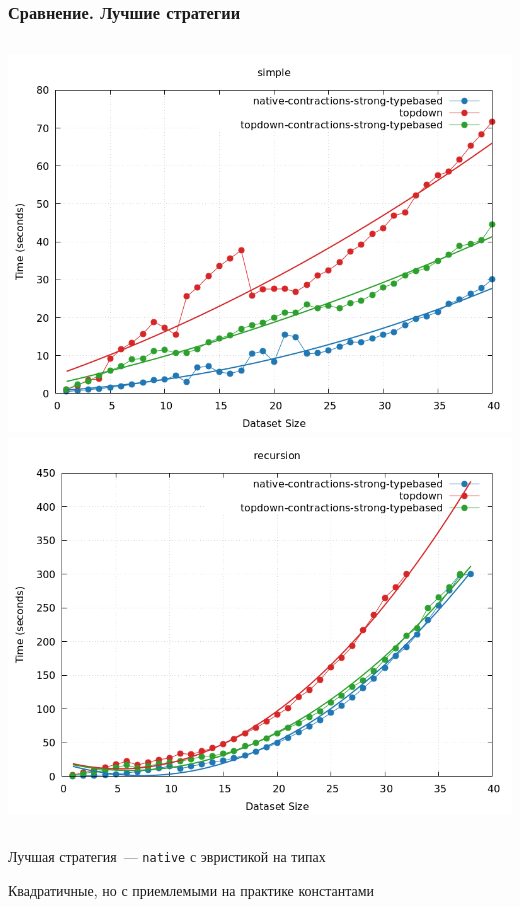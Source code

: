 \documentclass{beamer}
\begin{document}
\begin{frame}\frametitle{Сравнение. Лучшие стратегии}
  \begin{columns}
    \includegraphics[width=\textwidth]{winners_simple.png}
    \includegraphics[width=\textwidth]{winners_recursion.png}
  \end{columns}
  \bigskip
  \centering

  Лучшая стратегия~--- \texttt{native} с эвристикой на типах
  \bigskip

  Квадратичные, но с приемлемыми на практике константами
  \end{frame}  
\end{document}
